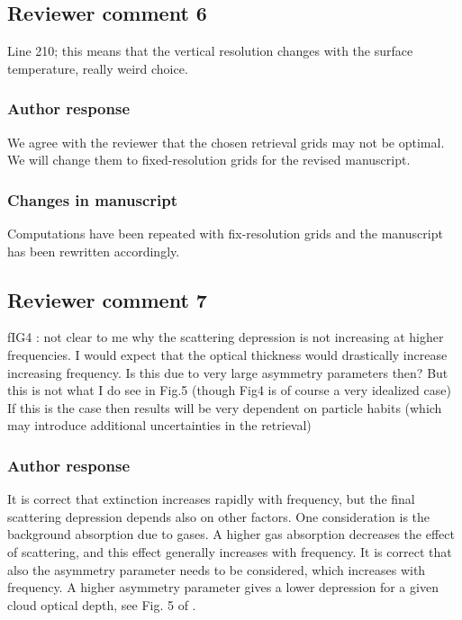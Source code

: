 \subsection*{Reviewer comment 6}
Line 210; this means that the vertical resolution changes with the surface temperature, really weird choice.

\subsubsection*{Author response}

We agree with the reviewer that the chosen retrieval grids may not be optimal.
We will change them to fixed-resolution grids for the revised manuscript.

\subsubsection*{Changes in manuscript}
Computations have been repeated with fix-resolution grids and the manuscript has been rewritten
accordingly.

\subsection*{Reviewer comment 7}

fIG4 : not clear to me why the scattering depression is not increasing at
higher frequencies. I would expect that the optical thickness would drastically
increase increasing frequency. Is this due to very large asymmetry parameters
then? But this is not what I do see in Fig.5 (though Fig4 is of course a very
idealized case) If this is the case then results will be very dependent on
particle habits (which may introduce additional uncertainties in the retrieval)

\subsubsection*{Author response}

It is correct that extinction increases rapidly with frequency, but the final
scattering depression depends also on other factors. One consideration is the
background absorption due to gases. A higher gas absorption decreases the effect
of scattering, and this effect generally increases with frequency. It is correct
that also the asymmetry parameter needs to be considered, which increases with
frequency. A higher asymmetry parameter gives a lower depression for a given
cloud optical depth, see Fig. 5 of \citet{eriksson15}.

